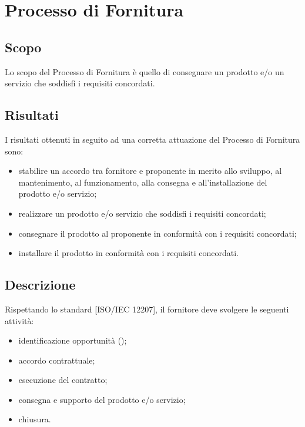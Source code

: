 \documentclass[../NormeDiProgetto.tex]{subfiles}
\begin{document}
	\section{Processo di Fornitura}
		\subsection{Scopo}
			Lo scopo del Processo di Fornitura è quello di consegnare un prodotto e/o un servizio che soddisfi i requisiti concordati.
		\subsection{Risultati}
			I risultati ottenuti in seguito ad una corretta attuazione del Processo di Fornitura sono:
			\begin{itemize}
				\item stabilire un accordo tra fornitore e proponente in merito allo sviluppo, al mantenimento, al funzionamento, alla consegna e all'installazione del prodotto e/o servizio;
				\item realizzare un prodotto e/o servizio che soddisfi i requisiti concordati;
				\item consegnare il prodotto al proponente in conformità con i requisiti concordati;
				\item installare il prodotto in conformità con i requisiti concordati.
			\end{itemize}
		\subsection{Descrizione}
			Rispettando lo standard [ISO/IEC 12207], il fornitore deve svolgere le seguenti attività:
			\begin{itemize}
				\item identificazione opportunità (\studiodifattibilita );
				\item accordo contrattuale;
				\item esecuzione del contratto;
				\item consegna e supporto del prodotto e/o servizio;
				\item chiusura.
			\end{itemize}
\end{document}
